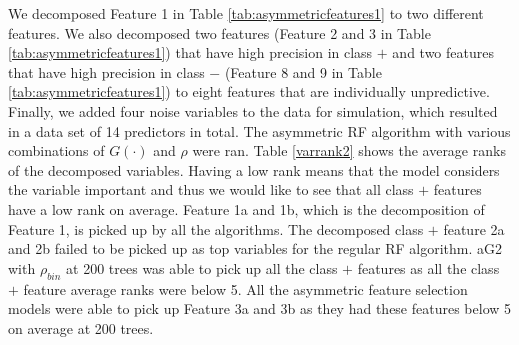 \documentclass[twoside,11pt]{article}
\begin{document}
 We decomposed Feature 1 in Table \ref{tab:asymmetricfeatures1} to two different features. We also decomposed two features (Feature 2 and 3 in Table \ref{tab:asymmetricfeatures1}) that have high precision in class $+$ and two features that have high precision in class $-$ (Feature 8 and 9 in Table \ref{tab:asymmetricfeatures1}) to eight features that are individually unpredictive. Finally, we added four noise variables to the data for simulation, which resulted in a data set of 14 predictors in total. The asymmetric RF algorithm with various combinations of $G(\cdot)$ and $\rho$ were ran. Table \ref{varrank2} shows the average ranks of the decomposed variables. Having a low rank means that the model considers the variable important and thus we would like to see that all class $+$ features have a low rank on average. Feature 1a and 1b, which is the decomposition of Feature 1, is picked up by all the algorithms. The decomposed class  $+$ feature 2a and 2b failed to be picked up as top variables for the regular RF algorithm. aG2 with $\rho_{bin}$ at 200 trees was able to pick up all the class $+$ features as all the class $+$ feature average ranks were below 5. All the asymmetric feature selection models were able to pick up Feature 3a and 3b as they had these features below 5 on average at 200 trees. 
\end{document}
